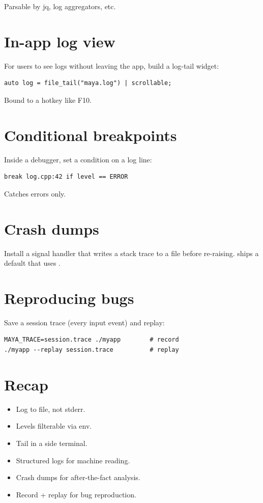 Parsable by jq, log aggregators, etc.

\section{In-app log view}

For users to see logs without leaving the app, build a
log-tail widget:

\begin{lstlisting}
auto log = file_tail("maya.log") | scrollable;
\end{lstlisting}

Bound to a hotkey like F10.

\section{Conditional breakpoints}

Inside a debugger, set a condition on a log line:

\begin{lstlisting}
break log.cpp:42 if level == ERROR
\end{lstlisting}

Catches errors only.

\section{Crash dumps}

Install a signal handler that writes a stack trace to a
file before re-raising. \maya{} ships a default that uses
.

\section{Reproducing bugs}

Save a session trace (every input event) and replay:

\begin{lstlisting}
MAYA_TRACE=session.trace ./myapp        # record
./myapp --replay session.trace          # replay
\end{lstlisting}

\section{Recap}

\begin{recap}
\begin{itemize}[leftmargin=*]
  \item Log to file, not stderr.
  \item Levels filterable via env.
  \item Tail in a side terminal.
  \item Structured logs for machine reading.
  \item Crash dumps for after-the-fact analysis.
  \item Record + replay for bug reproduction.
\end{itemize}
\end{recap}

